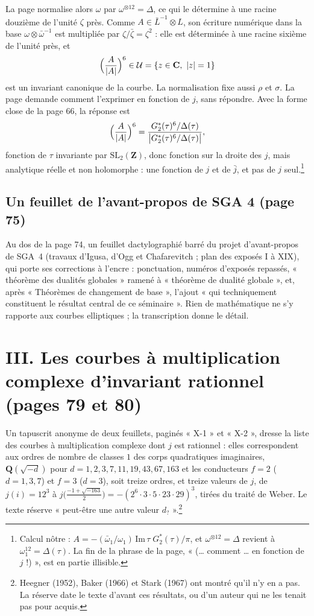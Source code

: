\documentclass[11pt,a4paper]{article}
\begin{document}
La page normalise alors $\omega$ par $\omega^{\otimes 12} = \Delta$, ce qui le
détermine à une racine douzième de l'unité $\zeta$ près. Comme $A \in \bar
L^{-1}\otimes L$, son écriture numérique dans la base $\omega\otimes\bar
\omega^{-1}$ est multipliée par $\zeta/\bar\zeta = \zeta^2$ : elle est
déterminée à une racine sixième de l'unité près, et
\[
\Bigl(\frac{A}{|A|}\Bigr)^{6} \in \mathcal{U} = \{z \in \mathbf{C},\ |z| = 1\}
\]
est un invariant canonique de la courbe. La normalisation fixe aussi $\rho$ et
$\sigma$. La page demande comment l'exprimer en fonction de $j$, sans
répondre. Avec la forme close de la page 66, la réponse est
\[
\Bigl(\frac{A}{|A|}\Bigr)^{6} = \frac{G_2^*(\tau)^6/\Delta(\tau)}
{\bigl|G_2^*(\tau)^6/\Delta(\tau)\bigr|},
\]
fonction de $\tau$ invariante par $\mathrm{SL}_2(\mathbf{Z})$, donc fonction sur
la droite des $j$, mais analytique réelle et non holomorphe : une
fonction de $j$ et de $\bar j$, et pas de $j$ seul.\footnote{Calcul nôtre :
$A = -(\bar\omega_1/\omega_1)\,\mathrm{Im}\,\tau\;G_2^*(\tau)/\pi$, et
$\omega^{\otimes 12} = \Delta$ revient à $\omega_1^{12} = \Delta(\tau)$. La
fin de la phrase de la page, « (\ldots{} comment \ldots{} en fonction de $j$ !) »,
est en partie illisible.}

\subsection*{Un feuillet de l'avant-propos de SGA 4 (page 75)}

Au dos de la page 74, un feuillet dactylographié barré du projet
d'avant-propos de SGA~4 (travaux d'Igusa, d'Ogg et Chafarevitch ; plan des
exposés I à XIX), qui porte ses corrections à l'encre : ponctuation, numéros
d'exposés repassés, « théorème des dualités globales » ramené à « théorème de
dualité globale », et, après « Théorèmes de changement de base », l'ajout
« qui techniquement constituent le résultat central de ce séminaire ». Rien de
mathématique ne s'y rapporte aux courbes elliptiques ; la transcription donne
le détail.

\section*{III. Les courbes à multiplication complexe d'invariant rationnel (pages 79 et 80)}

Un tapuscrit anonyme de deux feuillets, paginés « X-1 » et « X-2 », dresse la
liste des courbes à multiplication complexe dont $j$ est rationnel : elles
correspondent aux ordres de nombre de classes $1$ des corps quadratiques
imaginaires, $\mathbf{Q}(\sqrt{-d})$ pour $d = 1, 2, 3, 7, 11, 19, 43, 67,
163$ et les conducteurs $f = 2$ ($d = 1, 3, 7$) et $f = 3$ ($d = 3$), soit treize
ordres, et treize valeurs de $j$, de $j(i) = 12^3$ à $j\bigl(\tfrac{-1+\sqrt{-163}}{2}\bigr) =
-(2^6\cdot 3\cdot 5\cdot 23\cdot 29)^3$, tirées du traité de Weber. Le texte
réserve « peut-être une autre valeur $d_?$ ».\footnote{Heegner (1952), Baker
(1966) et Stark (1967) ont montré qu'il n'y en a pas. La réserve date le texte
d'avant ces résultats, ou d'un auteur qui ne les tenait pas pour acquis.}
\end{document}
